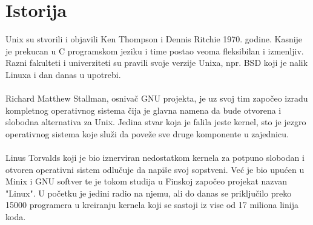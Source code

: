 \documentclass[a4paper,14pt]{article}
\begin{document}
\section{Istorija}
Unix su stvorili i objavili Ken Thompson i Dennis Ritchie 1970. godine. Kasnije je prekucan u C programskom jeziku i time postao veoma fleksibilan i izmenljiv. Razni fakulteti i univerziteti su pravili svoje verzije Unixa, npr. BSD koji je nalik Linuxa i dan danas u upotrebi.
\\\\
Richard Matthew Stallman, osnivač GNU projekta, je uz svoj tim započeo izradu kompletnog operativnog sistema čija je glavna namena da bude otvorena i slobodna alternativa za Unix. Jedina stvar koja je falila jeste kernel, sto je jezgro operativnog sistema koje služi da poveže sve druge komponente u zajednicu.
\\\\
Linus Torvalds koji je bio iznerviran nedostatkom kernela za potpuno slobodan i otvoren operativni sistem odlučuje da napiše svoj sopstveni. Već je bio upućen u Minix i GNU softver te je tokom studija u Finskoj započeo projekat nazvan "Linux". U početku je jedini radio na njemu, ali do danas se priključilo preko 15000 programera u kreiranju kernela koji se sastoji iz vise od 17 miliona linija koda.
\\\\
\begin{figure}[h]
	\centering
    \hspace{1cm}
\end{figure}
\end{document}
